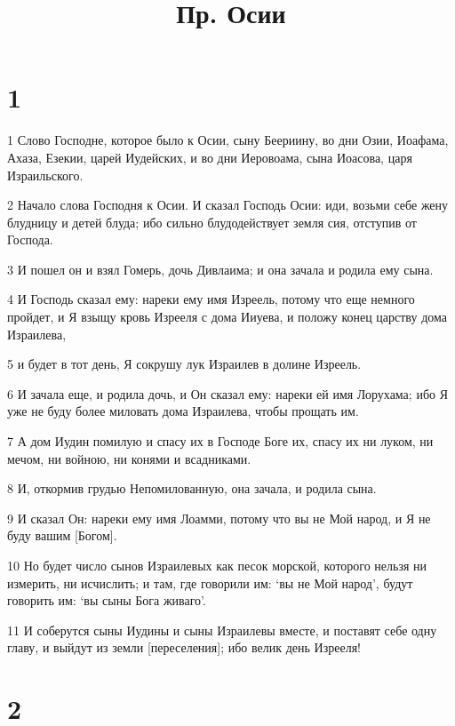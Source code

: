 

\title{Пр. Осии}


\chapter{1}

\par 1 Слово Господне, которое было к Осии, сыну Беериину, во дни Озии, Иоафама, Ахаза, Езекии, царей Иудейских, и во дни Иеровоама, сына Иоасова, царя Израильского.
\par 2 Начало слова Господня к Осии. И сказал Господь Осии: иди, возьми себе жену блудницу и детей блуда; ибо сильно блудодействует земля сия, отступив от Господа.
\par 3 И пошел он и взял Гомерь, дочь Дивлаима; и она зачала и родила ему сына.
\par 4 И Господь сказал ему: нареки ему имя Изреель, потому что еще немного пройдет, и Я взыщу кровь Изрееля с дома Ииуева, и положу конец царству дома Израилева,
\par 5 и будет в тот день, Я сокрушу лук Израилев в долине Изреель.
\par 6 И зачала еще, и родила дочь, и Он сказал ему: нареки ей имя Лорухама; ибо Я уже не буду более миловать дома Израилева, чтобы прощать им.
\par 7 А дом Иудин помилую и спасу их в Господе Боге их, спасу их ни луком, ни мечом, ни войною, ни конями и всадниками.
\par 8 И, откормив грудью Непомилованную, она зачала, и родила сына.
\par 9 И сказал Он: нареки ему имя Лоамми, потому что вы не Мой народ, и Я не буду вашим [Богом].
\par 10 Но будет число сынов Израилевых как песок морской, которого нельзя ни измерить, ни исчислить; и там, где говорили им: `вы не Мой народ', будут говорить им: `вы сыны Бога живаго'.
\par 11 И соберутся сыны Иудины и сыны Израилевы вместе, и поставят себе одну главу, и выйдут из земли [переселения]; ибо велик день Изрееля!

\chapter{2}

